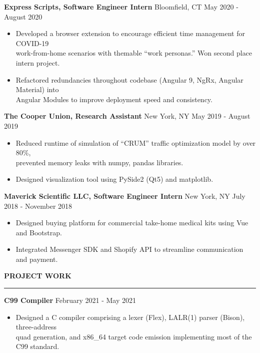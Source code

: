 \documentclass[]{article}
\newcommand{\br}{\vspace{10pt}}
\newcommand{\brs}{\vspace{3pt}}
\newcommand{\hr}{\vspace{4pt}\hrule\vspace{4pt}}
\begin{document}
\brs

\textbf{Express Scripts, Software Engineer Intern}
Bloomfield, CT
\hfill
May 2020 - August 2020
\begin{itemize}
\item Developed a browser extension to encourage efficient time management for
  COVID-19\\ work-from-home scenarios with themable ``work personas.'' Won
  second place intern project.
\item Refactored redundancies throughout codebase (Angular 9, NgRx, Angular
  Material) into\\ Angular Modules to improve deployment speed and consistency.
\end{itemize}

\brs

\textbf{The Cooper Union, Research Assistant}
New York, NY
\hfill
May 2019 - August 2019
\begin{itemize}
\item Reduced runtime of simulation of ``CRUM'' traffic optimization model by
  over 80\%,\\
  prevented memory leaks with numpy, pandas libraries.
\item Designed visualization tool using PySide2 (Qt5) and matplotlib.
\end{itemize}

\brs

\textbf{Maverick Scientific LLC, Software Engineer Intern}
New York, NY
\hfill
July 2018 - November 2018
\begin{itemize}
\item Designed buying platform for commercial take-home medical kits using Vue
  and Bootstrap.
\item Integrated Messenger SDK and Shopify API to streamline communication
  and payment.
\end{itemize}

\br

\textbf{PROJECT WORK}
\hr

\textbf{C99 Compiler}
\hfill
February 2021 - May 2021
\begin{itemize}
\item Designed a C compiler comprising a lexer (Flex), LALR(1) parser (Bison),
  three-address \\ quad generation, and x86\_64 target code emission
  implementing most of the C99 standard.
\end{itemize}

\brs
\end{document}
